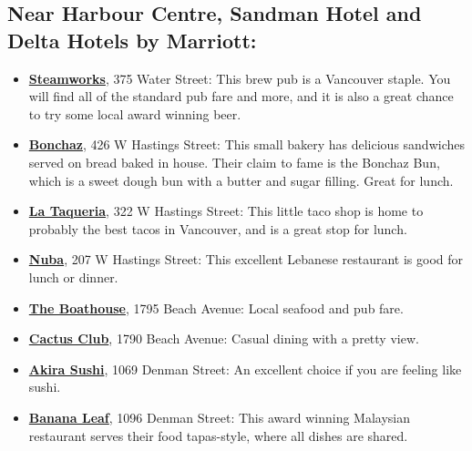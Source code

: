 \documentclass[letterpaper,12pt]{article}
\begin{document}
\subsection*{Near Harbour Centre, Sandman Hotel and Delta Hotels by Marriott:}
\begin{itemize}
\setlength{\itemsep}{0pt}
\item \href{http://www.steamworks.com}{\textbf{Steamworks}}, 375 Water Street: This brew pub is a Vancouver staple. You will find all of the standard pub fare and more, and it is also a great chance to try some local award winning beer.
\item \href{http://www.bonchaz.ca}{\textbf{Bonchaz}}, 426 W Hastings Street: This small bakery has delicious sandwiches served on bread baked in house. Their claim to fame is the Bonchaz Bun, which is a sweet dough bun with a butter and sugar filling. Great for lunch.
\item \href{http://www.lataqueria.com}{\textbf{La Taqueria}}, 322 W Hastings Street: This little taco shop is home to probably the best tacos in Vancouver, and is a great stop for lunch.
\item \href{http://www.nuba.ca}{\textbf{Nuba}}, 207 W Hastings Street: This excellent Lebanese restaurant is good for lunch or dinner.
\end{itemize}

\begin{itemize}
\setlength{\itemsep}{0pt}
\item \href{http://boathouserestaurants.ca/locations/#ENGLISH%20BAY}{\textbf{The Boathouse}}, 1795 Beach Avenue: Local seafood and pub fare.
\item \href{https://www.cactusclubcafe.com/location/english-bay/}{\textbf{Cactus Club}}, 1790 Beach Avenue: Casual dining with a pretty view.
\item \href{http://www.akirasushi.ca}{\textbf{Akira Sushi}}, 1069 Denman Street: An excellent choice if you are feeling like sushi.
\item \href{http://www.bananaleaf-vancouver.com}{\textbf{Banana Leaf}}, 1096 Denman Street: This award winning Malaysian restaurant serves their food tapas-style, where all dishes are shared.
\end{itemize}
\end{document}
